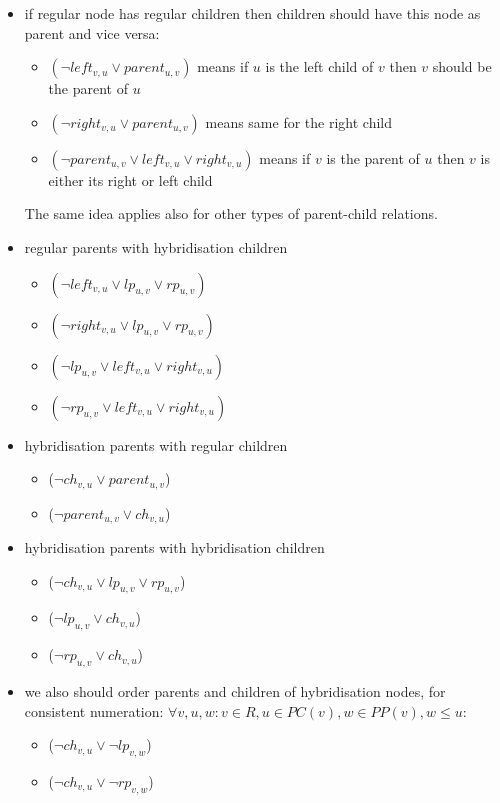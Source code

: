 \documentclass[runningheads, envcountsame, a4paper]{llncs}
\begin{document}
\begin{itemize}

\item if regular node has regular children then children should have this node as parent and vice versa:
    \begin{itemize}
    \item $(\neg left_{v,u} \vee parent_{u,v})$ means if $u$ is the left child of $v$ then $v$ should be the parent of $u$
    \item $(\neg right_{v,u} \vee parent_{u,v})$ means same for the right child
    \item $(\neg parent_{u,v} \vee left_{v,u} \vee right_{v,u})$ means if $v$ is the parent of $u$ then $v$ is either its right or left child
    \end{itemize}
The same idea applies also for other types of parent-child relations.

\item regular parents with hybridisation children
    \begin{itemize}
    \item $(\neg left_{v,u} \vee lp_{u,v} \vee rp_{u,v})$
    \item $(\neg right_{v,u} \vee lp_{u,v} \vee rp_{u,v})$
    \item $(\neg lp_{u,v} \vee left_{v,u} \vee right_{v,u})$
    \item $(\neg rp_{u,v} \vee left_{v,u} \vee right_{v,u})$
    \end{itemize}
    
\item hybridisation parents with regular children
    \begin{itemize}
    \item ($\neg ch_{v,u} \vee parent_{u,v}$)
    \item ($\neg parent_{u,v} \vee ch_{v,u}$)
    \end{itemize}
    
\item hybridisation parents with hybridisation children
    \begin{itemize}
    \item ($\neg ch_{v,u} \vee lp_{u,v} \vee rp_{u,v}$)
    \item ($\neg lp_{u,v} \vee ch_{v,u}$)
    \item ($\neg rp_{u,v} \vee ch_{v,u}$)
    \end{itemize}
    
\item we also should order parents and children of hybridisation nodes, for consistent numeration:
$\forall v, u, w: v \in R, u \in PC(v), w \in PP(v), w \leq u$:
    \begin{itemize}
    \item ($\neg ch_{v,u} \vee \neg lp_{v,w}$)
    \item ($\neg ch_{v,u} \vee \neg rp_{v,w}$)
    \end{itemize}

\end{itemize}
\end{document}
